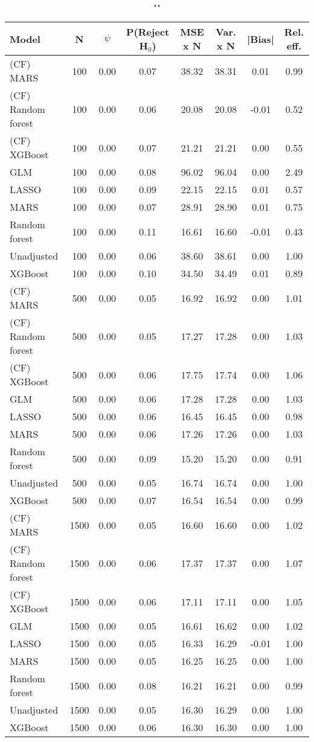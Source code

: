 \begin{table}
\centering
\caption{""}
\begin{tabular}{lccccccc}
\toprule
Model & N & $\psi$ & P(Reject H$_0$) & MSE x N & Var. x N & |Bias| & Rel. eff.\\ \midrule
(CF) MARS & 100 & 0.00 & 0.07 & 38.32 & 38.31 &  0.01 & 0.99 \\ 
(CF) Random forest & 100 & 0.00 & 0.06 & 20.08 & 20.08 & -0.01 & 0.52 \\ 
(CF) XGBoost & 100 & 0.00 & 0.07 & 21.21 & 21.21 &  0.00 & 0.55 \\ 
GLM & 100 & 0.00 & 0.08 & 96.02 & 96.04 &  0.00 & 2.49 \\ 
LASSO & 100 & 0.00 & 0.09 & 22.15 & 22.15 &  0.01 & 0.57 \\ 
MARS & 100 & 0.00 & 0.07 & 28.91 & 28.90 &  0.01 & 0.75 \\ 
Random forest & 100 & 0.00 & 0.11 & 16.61 & 16.60 & -0.01 & 0.43 \\ 
Unadjusted & 100 & 0.00 & 0.06 & 38.60 & 38.61 &  0.00 & 1.00 \\ 
XGBoost & 100 & 0.00 & 0.10 & 34.50 & 34.49 &  0.01 & 0.89 \\ \addlinespace 
(CF) MARS & 500 & 0.00 & 0.05 & 16.92 & 16.92 &  0.00 & 1.01 \\ 
(CF) Random forest & 500 & 0.00 & 0.05 & 17.27 & 17.28 &  0.00 & 1.03 \\ 
(CF) XGBoost & 500 & 0.00 & 0.06 & 17.75 & 17.74 &  0.00 & 1.06 \\ 
GLM & 500 & 0.00 & 0.06 & 17.28 & 17.28 &  0.00 & 1.03 \\ 
LASSO & 500 & 0.00 & 0.06 & 16.45 & 16.45 &  0.00 & 0.98 \\ 
MARS & 500 & 0.00 & 0.06 & 17.26 & 17.26 &  0.00 & 1.03 \\ 
Random forest & 500 & 0.00 & 0.09 & 15.20 & 15.20 &  0.00 & 0.91 \\ 
Unadjusted & 500 & 0.00 & 0.05 & 16.74 & 16.74 &  0.00 & 1.00 \\ 
XGBoost & 500 & 0.00 & 0.07 & 16.54 & 16.54 &  0.00 & 0.99 \\ \addlinespace 
(CF) MARS & 1500 & 0.00 & 0.05 & 16.60 & 16.60 &  0.00 & 1.02 \\ 
(CF) Random forest & 1500 & 0.00 & 0.06 & 17.37 & 17.37 &  0.00 & 1.07 \\ 
(CF) XGBoost & 1500 & 0.00 & 0.06 & 17.11 & 17.11 &  0.00 & 1.05 \\ 
GLM & 1500 & 0.00 & 0.05 & 16.61 & 16.62 &  0.00 & 1.02 \\ 
LASSO & 1500 & 0.00 & 0.05 & 16.33 & 16.29 & -0.01 & 1.00 \\ 
MARS & 1500 & 0.00 & 0.05 & 16.25 & 16.25 &  0.00 & 1.00 \\ 
Random forest & 1500 & 0.00 & 0.08 & 16.21 & 16.21 &  0.00 & 0.99 \\ 
Unadjusted & 1500 & 0.00 & 0.05 & 16.30 & 16.29 &  0.00 & 1.00 \\ 
XGBoost & 1500 & 0.00 & 0.06 & 16.30 & 16.30 &  0.00 & 1.00 \\
\bottomrule
\end{tabular}
\end{table}

